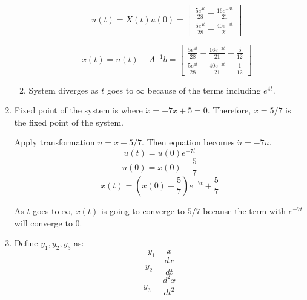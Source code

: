 \documentclass[12pt,a4paper, margin=1in]{article}
\newcommand\ddfrac[2]{\frac{\displaystyle #1}{\displaystyle #2}}
\begin{document}
\begin{enumerate}
\begin{enumerate}
            \begin{equation*}
                u(t) = X(t)u(0) = \begin{bmatrix}
                    \ddfrac{5e^{4t}}{28} - \ddfrac{16e^{-3t}}{21} \\[8pt]
                    \ddfrac{5e^{4t}}{28} - \ddfrac{40e^{-3t}}{21}
                \end{bmatrix}
            \end{equation*}

            \begin{equation*}
                x(t) = u(t) -  A^{-1}b = \begin{bmatrix}
                    \ddfrac{5e^{4t}}{28} - \ddfrac{16e^{-3t}}{21} - \ddfrac{5}{12}\\[8pt]
                    \ddfrac{5e^{4t}}{28} - \ddfrac{40e^{-3t}}{21} - \ddfrac{1}{12}
                \end{bmatrix}
            \end{equation*}
            
            \item 
            System diverges as $t$ goes to $\infty$ because of the terms including $e^{4t}$.
        \end{enumerate}
        
    \item %
        Fixed point of the system is where $\dot{x} = -7x + 5 = 0$.
        Therefore, $x=5/7$ is the fixed point of the system. \newline

        Apply transformation $u = x - 5/7$. Then equation becomes $\dot{u} = -7u$.
        \begin{equation*}
            u(t) = u(0)e^{-7t}
        \end{equation*}
        \begin{equation*}
            u(0) = x(0) - \frac{5}{7}
        \end{equation*}
        \begin{equation*}
            x(t) = (x(0) - \frac{5}{7})e^{-7t} + \frac{5}{7}
        \end{equation*}

        As $t$ goes to $\infty$, $x(t)$ is going to converge to $5/7$ because the term with $e^{-7t}$ will converge to $0$.
        
    \item %
        Define $y_1, y_2, y_3$ as:
        \begin{equation*}
            y_1 = x
        \end{equation*}
        \begin{equation*}
            y_2 = \frac{dx}{dt}
        \end{equation*}
        \begin{equation*}
            y_3 = \frac{d^2x}{dt^2}
        \end{equation*}


\end{enumerate}
\end{document}
